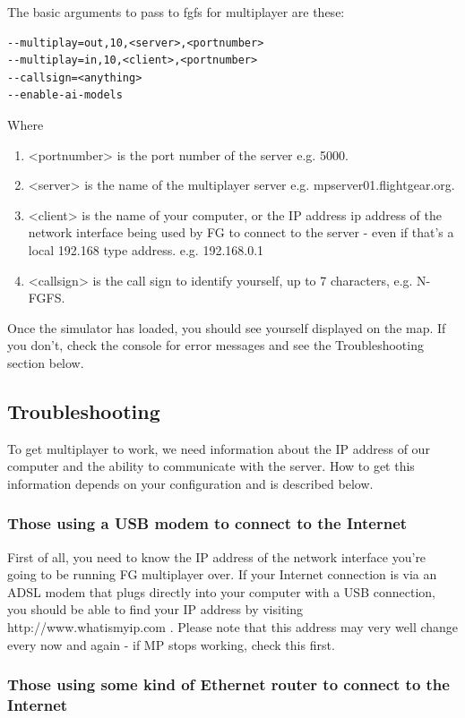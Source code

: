 The basic arguments to pass to fgfs for multiplayer are these:

\begin{verbatim}
--multiplay=out,10,<server>,<portnumber>
--multiplay=in,10,<client>,<portnumber>
--callsign=<anything>
--enable-ai-models
\end{verbatim}

Where 
\begin{enumerate}
\item <portnumber> is the port number of the server e.g. 5000.
\item <server> is the name of the multiplayer server e.g. mpserver01.flightgear.org.
\item <client> is the name of your computer, or the IP address ip address of the network interface being used by FG to connect to the server -
even if that's a local 192.168 type address. e.g. 192.168.0.1
\item <callsign> is the call sign to identify yourself, up to 7 characters, e.g. N-FGFS.
\end{enumerate}

Once the simulator has loaded, you should see yourself displayed on the map. If you don't, check the console for error messages and see the
Troubleshooting section below.

\subsection{Troubleshooting}

To get multiplayer to work, we need information about the IP address of our computer and the ability to communicate with the server. 
How to get this information depends on your configuration and is described below.


\subsubsection{Those using a USB modem to connect to the Internet}

First of all, you need to know the IP address of the network interface you're going to be running FG multiplayer over. 
If your Internet connection is via an ADSL modem that plugs directly into your computer with a USB connection, you 
should be able to find your IP address by visiting http://www.whatismyip.com . Please note that this address may very well 
change every now and again - if MP stops working, check this first.

\subsubsection{Those using some kind of Ethernet router to connect to the Internet}

